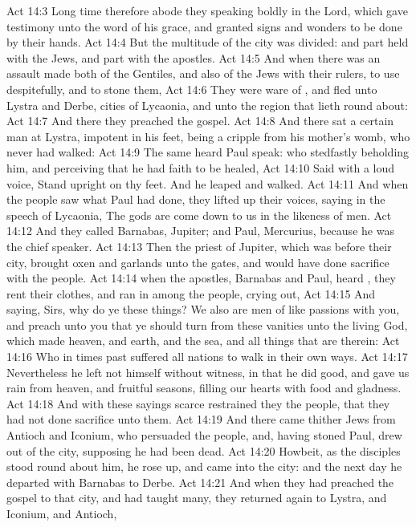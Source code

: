\vs Act 14:3 Long time therefore abode they speaking boldly in the Lord, which gave testimony unto the word of his grace, and granted signs and wonders to be done by their hands.
\vs Act 14:4 But the multitude of the city was divided: and part held with the Jews, and part with the apostles.
\vs Act 14:5 And when there was an assault made both of the Gentiles, and also of the Jews with their rulers, to use  despitefully, and to stone them,
\vs Act 14:6 They were ware of , and fled unto Lystra and Derbe, cities of Lycaonia, and unto the region that lieth round about:
\vs Act 14:7 And there they preached the gospel.
\vs Act 14:8 And there sat a certain man at Lystra, impotent in his feet, being a cripple from his mother's womb, who never had walked:
\vs Act 14:9 The same heard Paul speak: who stedfastly beholding him, and perceiving that he had faith to be healed,
\vs Act 14:10 Said with a loud voice, Stand upright on thy feet. And he leaped and walked.
\vs Act 14:11 And when the people saw what Paul had done, they lifted up their voices, saying in the speech of Lycaonia, The gods are come down to us in the likeness of men.
\vs Act 14:12 And they called Barnabas, Jupiter; and Paul, Mercurius, because he was the chief speaker.
\vs Act 14:13 Then the priest of Jupiter, which was before their city, brought oxen and garlands unto the gates, and would have done sacrifice with the people.
\vs Act 14:14  when the apostles, Barnabas and Paul, heard , they rent their clothes, and ran in among the people, crying out,
\vs Act 14:15 And saying, Sirs, why do ye these things? We also are men of like passions with you, and preach unto you that ye should turn from these vanities unto the living God, which made heaven, and earth, and the sea, and all things that are therein:
\vs Act 14:16 Who in times past suffered all nations to walk in their own ways.
\vs Act 14:17 Nevertheless he left not himself without witness, in that he did good, and gave us rain from heaven, and fruitful seasons, filling our hearts with food and gladness.
\vs Act 14:18 And with these sayings scarce restrained they the people, that they had not done sacrifice unto them.
\vs Act 14:19 And there came thither  Jews from Antioch and Iconium, who persuaded the people, and, having stoned Paul, drew  out of the city, supposing he had been dead.
\vs Act 14:20 Howbeit, as the disciples stood round about him, he rose up, and came into the city: and the next day he departed with Barnabas to Derbe.
\vs Act 14:21 And when they had preached the gospel to that city, and had taught many, they returned again to Lystra, and  Iconium, and Antioch,
